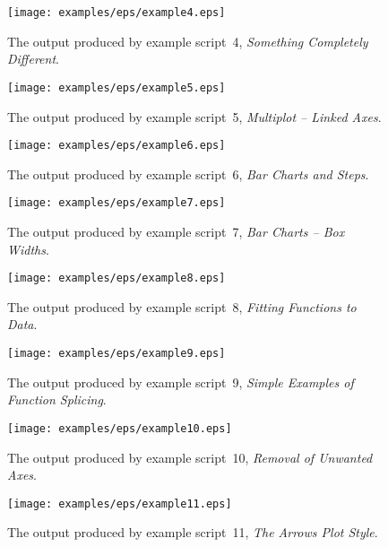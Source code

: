 \documentclass[a4paper,onecolumn,11pt]{book}
\begin{document}
\begin{figure}
\centerline{\texttt{[image: examples/eps/example4.eps]}}
\caption{The output produced by example script~4, \textit{Something Completely Different}.}
\label{fig_ex4}
\end{figure}

\begin{figure}
\centerline{\texttt{[image: examples/eps/example5.eps]}}
\caption{The output produced by example script~5, \textit{Multiplot -- Linked Axes}.}
\label{fig_ex5}
\end{figure}

\begin{figure}
\centerline{\texttt{[image: examples/eps/example6.eps]}}
\caption{The output produced by example script~6, \textit{Bar Charts and Steps}.}
\label{fig_ex6}
\end{figure}

\begin{figure}
\centerline{\texttt{[image: examples/eps/example7.eps]}}
\caption{The output produced by example script~7, \textit{Bar Charts -- Box Widths}.}
\label{fig_ex7}
\end{figure}

\begin{figure}
\centerline{\texttt{[image: examples/eps/example8.eps]}}
\caption{The output produced by example script~8, \textit{Fitting Functions to Data}.}
\label{fig_ex8}
\end{figure}

\begin{figure}
\centerline{\texttt{[image: examples/eps/example9.eps]}}
\caption{The output produced by example script~9, \textit{Simple Examples of Function Splicing}.}
\label{fig_ex9}
\end{figure}

\begin{figure}
\centerline{\texttt{[image: examples/eps/example10.eps]}}
\caption{The output produced by example script~10, \textit{Removal of Unwanted Axes}.}
\label{fig_ex10}
\end{figure}

\begin{figure}
\centerline{\texttt{[image: examples/eps/example11.eps]}}
\caption{The output produced by example script~11, \textit{The Arrows Plot Style}.}
\label{fig_ex11}
\end{figure}
\end{document}

